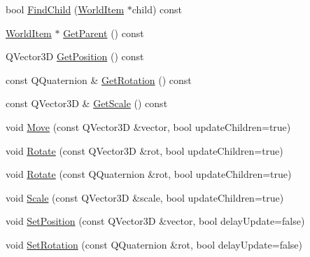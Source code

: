 \begin{DoxyCompactItemize}
\item 
bool \mbox{\hyperlink{class_geometry_engine_1_1_geometry_world_item_1_1_world_item_adcdcc221a212ff59ca34c8c7c96e69c7}{Find\+Child}} (\mbox{\hyperlink{class_geometry_engine_1_1_geometry_world_item_1_1_world_item}{World\+Item}} $\ast$child) const
\item 
\mbox{\hyperlink{class_geometry_engine_1_1_geometry_world_item_1_1_world_item}{World\+Item}} $\ast$ \mbox{\hyperlink{class_geometry_engine_1_1_geometry_world_item_1_1_world_item_a8b4ce24b3f39abee45d37e539ddb52c1}{Get\+Parent}} () const
\item 
Q\+Vector3D \mbox{\hyperlink{class_geometry_engine_1_1_geometry_world_item_1_1_world_item_a363a9b807eee91c99264ba1fc9b0e83b}{Get\+Position}} () const
\item 
const Q\+Quaternion \& \mbox{\hyperlink{class_geometry_engine_1_1_geometry_world_item_1_1_world_item_a34a387b75a951afaf8d73007a59bdf07}{Get\+Rotation}} () const
\item 
const Q\+Vector3D \& \mbox{\hyperlink{class_geometry_engine_1_1_geometry_world_item_1_1_world_item_a34e1c2617262114189597b1092a2d8ca}{Get\+Scale}} () const
\item 
void \mbox{\hyperlink{class_geometry_engine_1_1_geometry_world_item_1_1_world_item_ae7921493ddc77cf794358ae41754a3e0}{Move}} (const Q\+Vector3D \&vector, bool update\+Children=true)
\item 
void \mbox{\hyperlink{class_geometry_engine_1_1_geometry_world_item_1_1_world_item_aee1168fdbce65dfac9d75dfe61015036}{Rotate}} (const Q\+Vector3D \&rot, bool update\+Children=true)
\item 
void \mbox{\hyperlink{class_geometry_engine_1_1_geometry_world_item_1_1_world_item_aabed6bd78138071c0c7fb50a415ff285}{Rotate}} (const Q\+Quaternion \&rot, bool update\+Children=true)
\item 
void \mbox{\hyperlink{class_geometry_engine_1_1_geometry_world_item_1_1_world_item_ad6ca95d9209a5ab13975a3a7347b497d}{Scale}} (const Q\+Vector3D \&scale, bool update\+Children=true)
\item 
void \mbox{\hyperlink{class_geometry_engine_1_1_geometry_world_item_1_1_world_item_a81a1c5d0a550a56cc89d7e4e7f3c5c49}{Set\+Position}} (const Q\+Vector3D \&vector, bool delay\+Update=false)
\item 
void \mbox{\hyperlink{class_geometry_engine_1_1_geometry_world_item_1_1_world_item_ae8280e3f99ade1719aadc25b7bc999e9}{Set\+Rotation}} (const Q\+Quaternion \&rot, bool delay\+Update=false)
\item 

\end{DoxyCompactItemize}
